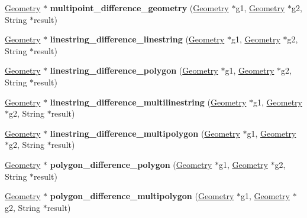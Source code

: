 \begin{DoxyCompactItemize}
\mbox{\hyperlink{classGeometry}{Geometry}} $\ast$ {\bfseries multipoint\+\_\+difference\+\_\+geometry} (\mbox{\hyperlink{classGeometry}{Geometry}} $\ast$g1, \mbox{\hyperlink{classGeometry}{Geometry}} $\ast$g2, String $\ast$result)
\item 
\mbox{\label{classBG__setop__wrapper_a3b0bdbd9898b88072eea91ebf988c3bc}} 
\mbox{\hyperlink{classGeometry}{Geometry}} $\ast$ {\bfseries linestring\+\_\+difference\+\_\+linestring} (\mbox{\hyperlink{classGeometry}{Geometry}} $\ast$g1, \mbox{\hyperlink{classGeometry}{Geometry}} $\ast$g2, String $\ast$result)
\item 
\mbox{\label{classBG__setop__wrapper_a3bfe099ddae6d1bba639a04fb14748e8}} 
\mbox{\hyperlink{classGeometry}{Geometry}} $\ast$ {\bfseries linestring\+\_\+difference\+\_\+polygon} (\mbox{\hyperlink{classGeometry}{Geometry}} $\ast$g1, \mbox{\hyperlink{classGeometry}{Geometry}} $\ast$g2, String $\ast$result)
\item 
\mbox{\label{classBG__setop__wrapper_a9b76f5f9fb3c8f511ad786a109047b32}} 
\mbox{\hyperlink{classGeometry}{Geometry}} $\ast$ {\bfseries linestring\+\_\+difference\+\_\+multilinestring} (\mbox{\hyperlink{classGeometry}{Geometry}} $\ast$g1, \mbox{\hyperlink{classGeometry}{Geometry}} $\ast$g2, String $\ast$result)
\item 
\mbox{\label{classBG__setop__wrapper_acfc42ce8744d523fa8adbe38ae80f1cd}} 
\mbox{\hyperlink{classGeometry}{Geometry}} $\ast$ {\bfseries linestring\+\_\+difference\+\_\+multipolygon} (\mbox{\hyperlink{classGeometry}{Geometry}} $\ast$g1, \mbox{\hyperlink{classGeometry}{Geometry}} $\ast$g2, String $\ast$result)
\item 
\mbox{\label{classBG__setop__wrapper_a874bbfdb03de97589a1e3a4f7a365ee7}} 
\mbox{\hyperlink{classGeometry}{Geometry}} $\ast$ {\bfseries polygon\+\_\+difference\+\_\+polygon} (\mbox{\hyperlink{classGeometry}{Geometry}} $\ast$g1, \mbox{\hyperlink{classGeometry}{Geometry}} $\ast$g2, String $\ast$result)
\item 
\mbox{\label{classBG__setop__wrapper_a8569a716c043b9b4471d2e8f32fa93d0}} 
\mbox{\hyperlink{classGeometry}{Geometry}} $\ast$ {\bfseries polygon\+\_\+difference\+\_\+multipolygon} (\mbox{\hyperlink{classGeometry}{Geometry}} $\ast$g1, \mbox{\hyperlink{classGeometry}{Geometry}} $\ast$g2, String $\ast$result)

\end{DoxyCompactItemize}
